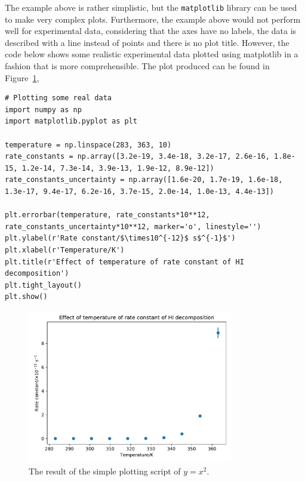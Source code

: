 \documentclass[a4paper]{article}
\begin{document}
The example above is rather simplistic, but the \texttt{matplotlib} library can be used to make very complex plots.
Furthermore, the example above would not perform well for experimental data, considering that the axes have no labels, the data is described with a line instead of points and there is no plot title.
However, the code below shows some realistic experimental data plotted using matplotlib in a fashion that is more comprehensible.
The plot produced can be found in Figure~\ref{fig:real},
\begin{lstlisting}
# Plotting some real data
import numpy as np
import matplotlib.pyplot as plt

temperature = np.linspace(283, 363, 10)
rate_constants = np.array([3.2e-19, 3.4e-18, 3.2e-17, 2.6e-16, 1.8e-15, 1.2e-14, 7.3e-14, 3.9e-13, 1.9e-12, 8.9e-12])
rate_constants_uncertainty = np.array([1.6e-20, 1.7e-19, 1.6e-18, 1.3e-17, 9.4e-17, 6.2e-16, 3.7e-15, 2.0e-14, 1.0e-13, 4.4e-13])

plt.errorbar(temperature, rate_constants*10**12, rate_constants_uncertainty*10**12, marker='o', linestyle='')
plt.ylabel(r'Rate constant/$\times10^{-12}$ s$^{-1}$')
plt.xlabel(r'Temperature/K')
plt.title(r'Effect of temperature of rate constant of HI decomposition')
plt.tight_layout()
plt.show()
\end{lstlisting}
%
\begin{figure}[t]
\centering
\includegraphics[width=0.8\textwidth]{real}
\caption{\label{fig:real} The result of the simple plotting script of $y = x ^ 2$.}
\end{figure}
%
\vspace{\baselineskip}
\begin{center}
	\noindent{}
\end{center}
\end{document}
